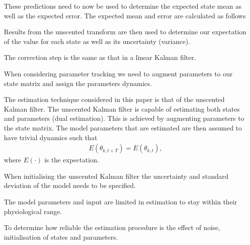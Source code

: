 These predictions need to now be used to determine the expected state mean as well as the expected error. The expected mean and error are calculated as follows 


Results from the unscented transform are then used to determine our expectation of the value for each state as well as its uncertainty (variance).

The correction step is the same as that in a linear Kalman filter.

When considering parameter tracking we need to augment parameters to our state matrix and assign the parameters dynamics.

The estimation technique considered in this paper is that of the unscented Kalman filter. The unscented Kalman filter is capable of estimating both states and parameters (dual estimation). This is achieved by augmenting parameters to the state matrix. The model parameters that are estimated are then assumed to have trivial dynamics such that \begin{align}
E(\theta_{k,t+T}) = E(\theta_{k,t}),
\end{align} where $E(\cdot)$ is the expectation.

When initialising the unscented Kalman filter the uncertainty and standard deviation of the model needs to be specified.

The model parameters and input are limited in estimation to stay within their physiological range.

To determine how reliable the estimation procedure is the effect of noise, initialisation of states and parameters.





